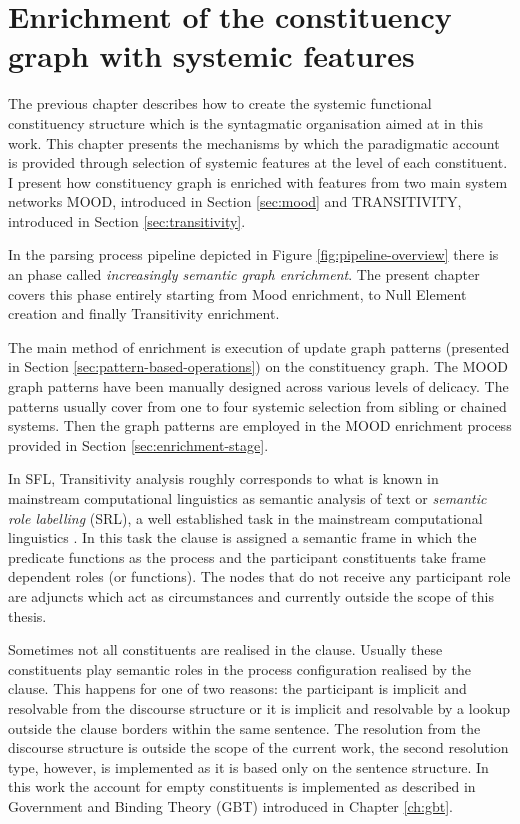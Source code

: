 \chapter{Enrichment of the constituency graph with systemic features}
\label{ch:enrichment-stage}

The previous chapter describes how to create the systemic functional constituency structure which is the syntagmatic organisation aimed at in this work. This chapter presents the mechanisms by which the paradigmatic account is provided through selection of systemic features at the level of each constituent. I present how constituency graph is enriched with features from two main system networks MOOD, introduced in Section \ref{sec:mood} and TRANSITIVITY, introduced in Section \ref{sec:transitivity}.

In the parsing process pipeline depicted in Figure \ref{fig:pipeline-overview} there is an phase called \textit{increasingly semantic graph enrichment}. The present chapter covers this phase entirely starting from Mood enrichment, to Null Element creation and finally Transitivity enrichment.

The main method of enrichment is execution of update graph patterns (presented in Section \ref{sec:pattern-based-operations}) on the constituency graph. The MOOD graph patterns have been manually designed across various levels of delicacy. The patterns usually cover from one to four systemic selection from sibling or chained systems. Then the graph patterns are employed in the MOOD enrichment process provided  in Section \ref{sec:enrichment-stage}. 

In SFL, Transitivity analysis roughly corresponds to what is known in mainstream computational linguistics as semantic analysis of text or \textit{semantic role labelling} (SRL), a well established task in the mainstream computational linguistics \citep{Carreras2005, Pradhan2007}. In this task the clause is assigned a semantic frame in which the predicate functions as the process and the participant constituents take frame dependent roles (or functions). The nodes that do not receive any participant role are adjuncts which act as circumstances and currently outside the scope of this thesis.

Sometimes not all constituents are realised in the clause. Usually these constituents play semantic roles in the process configuration realised by the clause. This happens for one of two reasons: the participant is implicit and resolvable from the discourse structure or it is implicit and resolvable by a lookup outside the clause borders within the same sentence. The resolution from the discourse structure is outside the scope of the current work, the second resolution type, however, is implemented as it is based only on the sentence structure. In this work the account for empty constituents is implemented as described in Government and Binding Theory (GBT) \citep{Haegeman1991} introduced in Chapter \ref{ch:gbt}.

